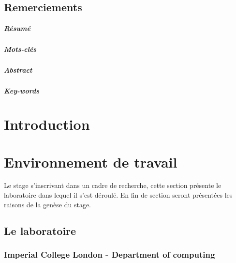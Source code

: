 \documentclass[10pt]{report}
\begin{document}
\section*{Remerciements}\newpage
\paragraph*{Résumé} %
\paragraph*{Mots-clés}
\paragraph*{Abstract}
\paragraph*{Key-words}

\renewcommand\contentsname{Sommaire}
\tableofcontents

\newpage

\chapter*{Introduction}
\chapter{Environnement de travail} 
	Le stage s'inscrivant dans un cadre de recherche, cette section présente le laboratoire dans lequel il s'est déroulé. En fin de section seront présentées les raisons de la genèse du stage.
	\section{Le laboratoire}
	\subsection{Imperial College London - Department of computing}
\end{document}
